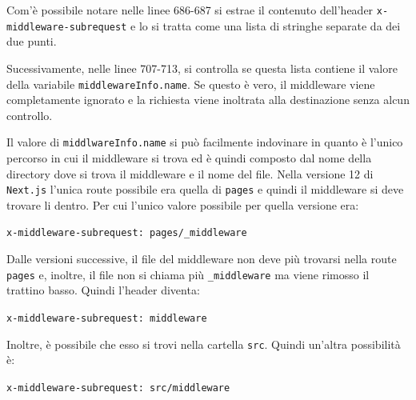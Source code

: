 \documentclass[a4paper,oneside,12pt]{report}
\begin{document}
Com'\`e possibile notare nelle linee 686-687 si estrae il contenuto dell'header \texttt{x-middleware-subrequest} e lo si tratta come una lista di stringhe separate da dei due punti.

Sucessivamente, nelle linee 707-713, si controlla se questa lista contiene il valore della variabile \texttt{middlewareInfo.name}. Se questo \`e vero, il middleware viene completamente ignorato e la richiesta viene inoltrata alla destinazione senza alcun controllo.

Il valore di \texttt{middlwareInfo.name} si pu\`o facilmente indovinare in quanto \`e l'unico percorso in cui il middleware si trova ed \`e quindi composto dal nome della directory dove si trova il middleware e il nome del file. Nella versione 12 di \texttt{Next.js} l'unica route possibile era quella di \texttt{pages} e quindi il middleware si deve trovare li dentro. Per cui l'unico valore possibile per quella versione era:
\begin{center}
	\scriptsize
	\texttt{x-middleware-subrequest: pages/\_middleware}
\end{center}

Dalle versioni successive, il file del middleware non deve pi\`u trovarsi nella route \texttt{pages} e, inoltre, il file non si chiama pi\`u \texttt{\_middleware} ma viene rimosso il trattino basso. Quindi l'header diventa:
\begin{center}
	\scriptsize
	\texttt{x-middleware-subrequest: middleware}
\end{center}

Inoltre, \`e possibile che esso si trovi nella cartella \texttt{src}. Quindi un'altra possibilit\`a \`e:
\begin{center}
	\scriptsize
	\texttt{x-middleware-subrequest: src/middleware}
\end{center}
\end{document}
